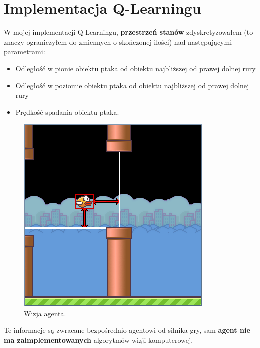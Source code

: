 \documentclass[a4paper, 12pt,oneside]{book}
\begin{document}
\section{Implementacja Q-Learningu}
W mojej implementacji Q-Learningu, \textbf{przestrzeń stanów} zdyskretyzowałem
(to znaczy ograniczyłem do zmiennych o skończonej ilości) nad następującymi
parametrami:
\begin{itemize}
	\setlength\itemsep{-0.4em}
	\item Odległość w pionie obiektu ptaka od obiektu najbliższej od prawej
		dolnej rury
	\item Odległość w poziomie obiektu ptaka od obiektu najbliższej od 
		prawej dolnej rury
	\item Prędkość spadania obiektu ptaka.
\end{itemize}
\begin{figure}[!htb]
	\begin{center}
	\includegraphics[scale=0.80]{agent_vision.png}
	\end{center}
	\caption{Wizja agenta.}
	\label{agent_vision}
\end{figure}

Te informacje są zwracane bezpośrednio agentowi od silnika gry, sam 
\textbf{agent nie ma zaimplementowanych} algorytmów wizji komputerowej.
\end{document}
